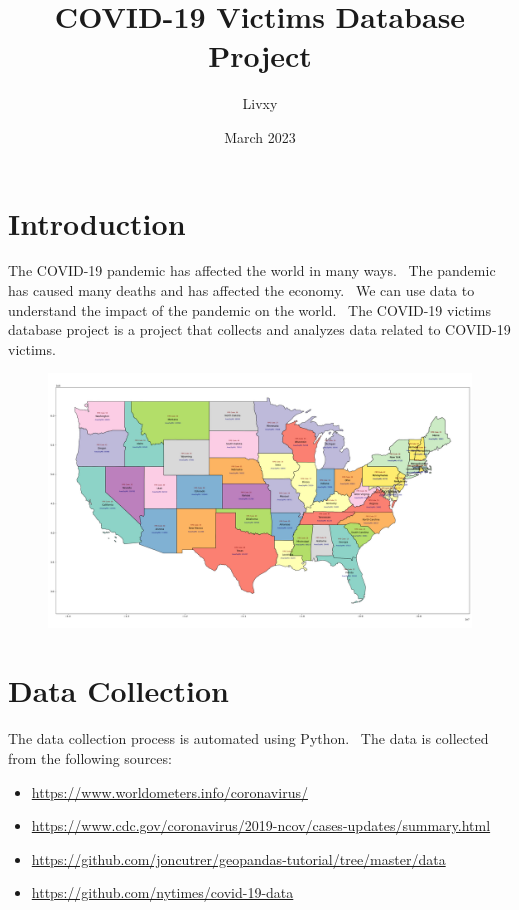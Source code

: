 \documentclass{article}
\begin{document}
\title{COVID-19 Victims Database Project}
\author{Livxy}
\date{March 2023}

\maketitle
\thispagestyle{empty}
\vspace{50cm}


\section{Introduction}
The COVID-19 pandemic has affected the world in many ways. \
The pandemic has caused many deaths and has affected the economy. \
We can use data to understand the impact of the pandemic on the world. \
The COVID-19 victims database project is a project that collects and analyzes data related to COVID-19 victims.

\begin{figure}[h]
\centering
\includegraphics[width=1\textwidth]{images/USA.png}
\end{figure}


\section{Data Collection}
The data collection process is automated using Python. \
The data is collected from the following sources: \
\begin{itemize}
\item \url{https://www.worldometers.info/coronavirus/}
\item \url{https://www.cdc.gov/coronavirus/2019-ncov/cases-updates/summary.html}
\item \url{https://github.com/joncutrer/geopandas-tutorial/tree/master/data}
\item \url{https://github.com/nytimes/covid-19-data}
\end{itemize}
\end{document}
